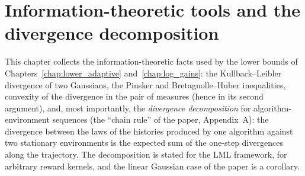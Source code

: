 \chapter{Information-theoretic tools and the divergence decomposition}
\label{chap:pre_info}

This chapter collects the information-theoretic facts used by the lower bounds of
Chapters~\ref{chap:lower_adaptive} and~\ref{chap:log_gains}: the Kullback--Leibler divergence
of two Gaussians, the Pinsker and Bretagnolle--Huber inequalities, convexity of the divergence
in the pair of measures (hence in its second argument), and, most importantly, the \emph{divergence decomposition} for
algorithm-environment sequences (the ``chain rule'' of the paper, Appendix~A): the divergence
between the laws of the histories produced by one algorithm against two stationary
environments is the expected sum of the one-step divergences along the trajectory. The
decomposition is stated for the LML framework, for arbitrary reward kernels, and the linear
Gaussian case of the paper is a corollary.

